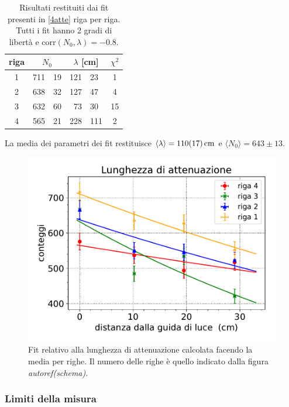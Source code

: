 \begin{table}[h]
\centering
\begin{tabular}{| c | r @{$\pm$} l  | r @{$\pm$} l  | c |}
\hline
riga & \multicolumn{2}{c|}{$N_0$} & \multicolumn{2}{c|}{ $\lambda$ [\si{cm}] } & $\chi^2$  \\
\hline
1 & 711&19 & 121&23 & 1  \\
2 & 638&32 & 127&47 & 4 \\
3 & 632&60 & 73&30 & 15 \\
4 & 565&21 & 228&111 & 2 \\
\hline
\end{tabular}
\caption{Risultati restituiti dai fit presenti in \autoref{4atte} riga per riga. Tutti i fit hanno 2 gradi di libertà e corr$(N_0,\lambda)=-0.8$. }
\label{tab:righe}
\end{table}


La media dei parametri dei fit restituisce $\langle\lambda\rangle=\SI{110\pm17}{cm}$ e $\langle N_0\rangle=643\pm13$.
\begin{figure}[h]
\centering
\includegraphics[width=8 cm]{4atte}
\caption{Fit relativo alla lunghezza di attenuazione calcolata facendo la media per righe. Il numero delle righe è quello indicato dalla figura \emph{autoref(schema)}.}
\label{4atte}
\end{figure}


\subsubsection{Limiti della misura}

